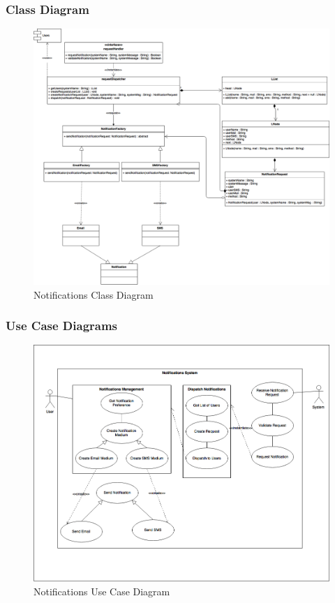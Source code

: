 \documentclass{article}
\begin{document}
        \subsubsection{Class Diagram}
		\begin{figure}[H]
  			\caption{Notifications Class Diagram}
  			\centering
    			\includegraphics[width=\textwidth]{Notifications_Class_Diagram}
		\end{figure}
        \subsubsection{Use Case Diagrams}
		\begin{figure}[H]
  			\caption{Notifications Use Case Diagram}
  			\centering
    			\includegraphics[width=\textwidth]{NotificationUseCases}
		\end{figure}
\end{document}
